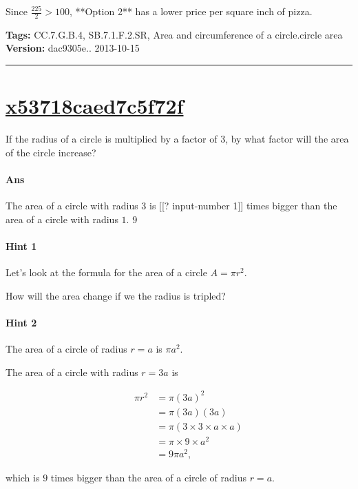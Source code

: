 \documentclass[twocolumn,10pt]{article}
\begin{document}
Since $\frac{225}{2} > 100$, **Option 2** has a lower price per square inch of pizza.



\medskip
\noindent
\textbf{Tags:} {\footnotesize CC.7.G.B.4, SB.7.1.F.2.SR, Area and circumference of a circle.circle area}\\
\textbf{Version:} dac9305e.. 2013-10-15
\smallskip\hrule





\section{\href{https://www.khanacademy.org/devadmin/content/items/x53718caed7c5f72f}{x53718caed7c5f72f}}

\noindent
If the radius of a circle is multiplied by a factor of $3$, by what factor will the area of the circle increase?

\paragraph{Ans} The area of a circle with radius $3$ is [[? input-number 1]] times bigger than the area of a circle with radius $1$.  9

\paragraph{Hint 1}Let's look at the formula for the area of a circle $A=\pi r^2$.  

How will the area change if we the radius is tripled?

\paragraph{Hint 2}The area of a circle of radius $r=a$ is $\pi a^2$.

The area of a circle with radius $r=3a$ is 

\begin{align*}
\qquad 
 \pi r^2 & =\pi (3a)^2  \\
  & =\pi(3a)(3a) \\
  &=\pi(3 \times 3 \times a \times a)  \\
   &= \pi \times 9 \times a^2 \\
   &= 9\pi a^2,
\end{align*} 

which is $9$ times bigger than the area of a circle of radius $r=a$. 
\end{document}
